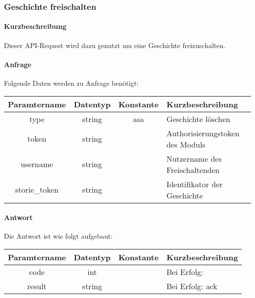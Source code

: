 \subsubsection{Geschichte freischalten}
\paragraph{Kurzbeschreibung}Dieser API-Request wird dazu genutzt um eine Geschichte freizuschalten.
\paragraph{Anfrage}Folgende Daten werden zu Anfrage benötigt:
\begin{table}[H]
	\begin{tabular}{|c|c|c|p{6.5cm}|}
		\hline
		\textbf{Paramtername} & \textbf{Datentyp} & \textbf{Konstante} & \textbf{Kurzbeschreibung}                                                                                               \\ \hline
		type                & string            & asa                & Geschichte löschen \\ \hline
		token               & string            &                    & Authorisierungstoken des Moduls \\ \hline
		username            & string            &                    & Nutzername des Freischaltenden \\ \hline
		storie\_token       & string            &                    & Identifikator der Geschichte \\ \hline
	\end{tabular}
\end{table}
\paragraph{Antwort}Die Antwort ist wie folgt aufgebaut:
\begin{table}[H]
	\begin{tabular}{|c|c|c|p{6.5cm}|}
		\hline
		\textbf{Paramtername} & \textbf{Datentyp} & \textbf{Konstante} & \textbf{Kurzbeschreibung}            \\ \hline                
		code                & int              &                 & Bei Erfolg: {\glqq 0\grqq} \\ \hline
		result              & string           &                 & Bei Erfolg: {\glqq ack\grqq} \\ \hline
	\end{tabular}
\end{table}
